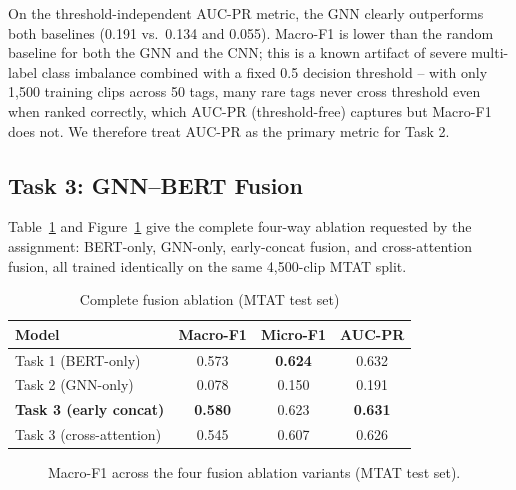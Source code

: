 \documentclass[conference]{IEEEtran}
\begin{document}
On the threshold-independent AUC-PR metric, the GNN clearly
outperforms both baselines (0.191 vs.\ 0.134 and 0.055). Macro-F1 is
lower than the random baseline for both the GNN and the CNN; this is a
known artifact of severe multi-label class imbalance combined with a
fixed 0.5 decision threshold -- with only 1{,}500 training clips
across 50 tags, many rare tags never cross threshold even when ranked
correctly, which AUC-PR (threshold-free) captures but Macro-F1 does
not. We therefore treat AUC-PR as the primary metric for Task 2.

\subsection{Task 3: GNN--BERT Fusion}
Table~\ref{tab:task3} and Figure~\ref{fig:ablation} give the complete
four-way ablation requested by the assignment: BERT-only, GNN-only,
early-concat fusion, and cross-attention fusion, all trained
identically on the same 4{,}500-clip MTAT split.

\begin{table}[h]
\centering
\caption{Complete fusion ablation (MTAT test set)}
\label{tab:task3}
\begin{tabular}{lccc}
\toprule
Model & Macro-F1 & Micro-F1 & AUC-PR \\
\midrule
Task 1 (BERT-only) & 0.573 & \textbf{0.624} & 0.632 \\
Task 2 (GNN-only) & 0.078 & 0.150 & 0.191 \\
\textbf{Task 3 (early concat)} & \textbf{0.580} & 0.623 & \textbf{0.631} \\
Task 3 (cross-attention) & 0.545 & 0.607 & 0.626 \\
\bottomrule
\end{tabular}
\end{table}

\begin{figure}[t]
\centering
{}
\caption{Macro-F1 across the four fusion ablation variants (MTAT test set).}
\label{fig:ablation}
\end{figure}
\end{document}
